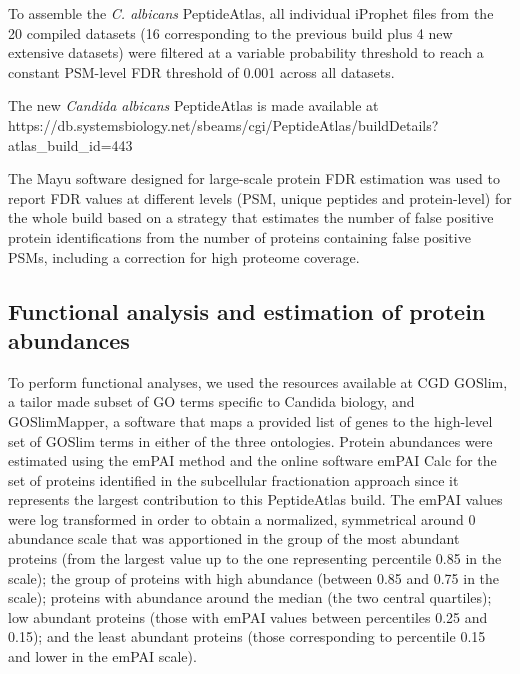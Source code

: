 To assemble the \textit{C. albicans} PeptideAtlas, all individual iProphet files from the 20 compiled
datasets (16 corresponding to the previous build plus 4 new extensive datasets) were filtered
at a variable probability threshold to reach a constant PSM-level FDR threshold of 0.001
across all datasets.

The new \textit{Candida albicans} PeptideAtlas is made available at \linebreak
https://db.systemsbiology.net/sbeams/cgi/PeptideAtlas/buildDetails?atlas\_build\_id=443 \linebreak

The Mayu \citep{Reiter2009} software designed for large-scale protein FDR estimation was used to report
FDR values at different levels (PSM, unique peptides and protein-level) for the whole build
based on a strategy that estimates the number of false positive protein identifications from
the number of proteins containing false positive PSMs, including a correction for high
proteome coverage.



\subsection*{Functional analysis and estimation of protein abundances}

To perform functional analyses, we used the resources available at CGD GOSlim, a tailor
made subset of GO terms specific to Candida biology, and GOSlimMapper, a software that
maps a provided list of genes to the high-level set of GOSlim terms in either of the three
ontologies.
Protein abundances were estimated using the emPAI method \citep{Ishihama2005} and the online software
emPAI Calc \citep{Shinoda2010} for the set of proteins identified in the subcellular fractionation approach
since it represents the largest contribution to this PeptideAtlas build. The emPAI values were
log transformed in order to obtain a normalized, symmetrical around 0 abundance scale that
was apportioned in the group of the most abundant proteins (from the largest value up to the
one representing percentile 0.85 in the scale); the group of proteins with high abundance
(between 0.85 and 0.75 in the scale); proteins with abundance around the median (the two
central quartiles); low abundant proteins (those with emPAI values between percentiles 0.25
and 0.15); and the least abundant proteins (those corresponding to percentile 0.15 and lower
in the emPAI scale).



